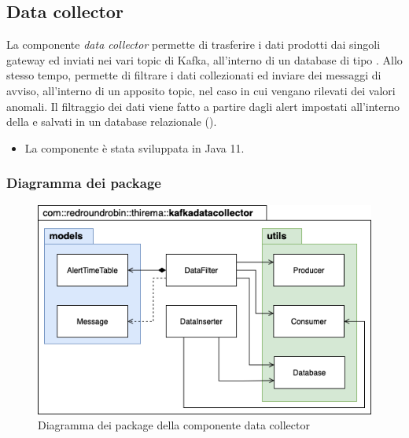 \subsection{Data collector}
	La componente \textit{data collector} permette di trasferire i dati prodotti dai singoli gateway ed inviati nei vari topic di Kafka, all'interno di un database di tipo .
	\newline
	Allo stesso tempo, permette di filtrare i dati collezionati ed inviare dei messaggi di avviso, all'interno di un apposito topic, nel caso in cui vengano rilevati dei valori anomali.
	\newline
	Il filtraggio dei dati viene fatto a partire dagli alert impostati all'interno della  e salvati in un database relazionale ().
	\begin{itemize}
		\item La componente è stata sviluppata in Java 11.
	\end{itemize}
	
		\subsubsection{Diagramma dei package}%
		\begin{figure}[H]
				\centering
				\includegraphics[scale=0.600]{res/images/DATACOLLECTOR/Packagekafkadatacollector.png}
				\caption{Diagramma dei package della componente data collector}
				\label{Diagramma 5}
			\end{figure}
